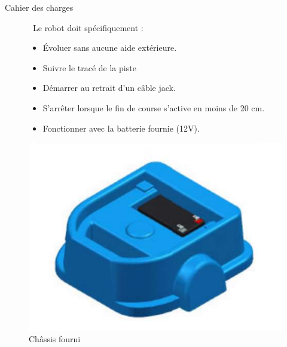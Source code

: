  \begin{frame}{Cahier des charges}
    \begin{figure}[H]
        \centering
        \begin{minipage}{.5\textwidth}
            \
            Le robot doit spécifiquement : 
            \begin{itemize}
                \item Évoluer sans aucune aide extérieure.
                \item Suivre le tracé de la piste
                \item Démarrer au retrait d’un câble jack.
                \item S'arrêter lorsque le fin de course s’active en moins de 20 cm.
                \item Fonctionner avec la batterie fournie (12V).
            \end{itemize}
        \end{minipage}%
        \begin{minipage}{.5\textwidth}
            \centering
            \includegraphics[width=.5\linewidth]{Images/carcasse.png}
            \caption{Châssis fourni}
        \label{fig:carcasse}
        \end{minipage}
    \end{figure}

\vfill\footer{\hfill\insertframenumber/\inserttotalframenumber}
 \end{frame}